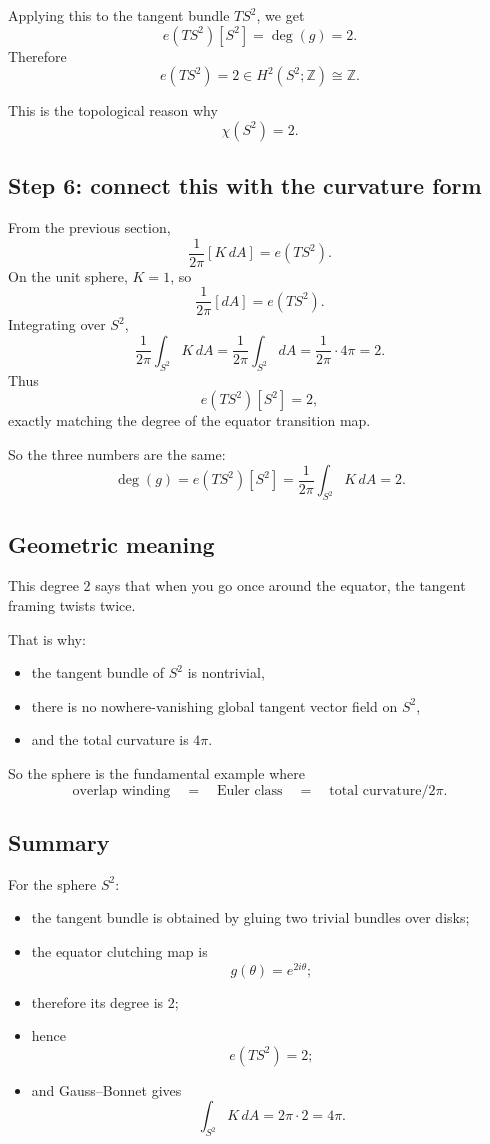 \documentclass[11pt]{article}
\begin{document}
	Applying this to the tangent bundle \(TS^2\), we get
	\[
	e(TS^2)[S^2]=\deg(g)=2.
	\]
	Therefore
	\[
	e(TS^2)=2\in H^2(S^2;\mathbb{Z})\cong \mathbb{Z}.
	\]
	
	This is the topological reason why
	\[
	\chi(S^2)=2.
	\]
	
	\subsection*{Step 6: connect this with the curvature form}
	
	From the previous section,
	\[
	\frac{1}{2\pi}[K\,dA]=e(TS^2).
	\]
	On the unit sphere, \(K=1\), so
	\[
	\frac{1}{2\pi}[dA]=e(TS^2).
	\]
	Integrating over \(S^2\),
	\[
	\frac{1}{2\pi}\int_{S^2}K\,dA
	=
	\frac{1}{2\pi}\int_{S^2}dA
	=
	\frac{1}{2\pi}\cdot 4\pi
	=
	2.
	\]
	Thus
	\[
	e(TS^2)[S^2]=2,
	\]
	exactly matching the degree of the equator transition map.
	
	So the three numbers are the same:
	\[
	\boxed{
		\deg(g)=e(TS^2)[S^2]=\frac{1}{2\pi}\int_{S^2}K\,dA=2.
	}
	\]
	
	\subsection*{Geometric meaning}
	
	This degree \(2\) says that when you go once around the equator, the tangent framing twists twice.
	
	That is why:
	\begin{itemize}
		\item the tangent bundle of \(S^2\) is nontrivial,
		\item there is no nowhere-vanishing global tangent vector field on \(S^2\),
		\item and the total curvature is \(4\pi\).
	\end{itemize}
	
	So the sphere is the fundamental example where
	\[
	\text{overlap winding}
	\quad=\quad
	\text{Euler class}
	\quad=\quad
	\text{total curvature}/2\pi.
	\]
	
	\subsection*{Summary}
	
	For the sphere \(S^2\):
	\begin{itemize}
		\item the tangent bundle is obtained by gluing two trivial bundles over disks;
		\item the equator clutching map is
		\[
		g(\theta)=e^{2i\theta};
		\]
		\item therefore its degree is \(2\);
		\item hence
		\[
		e(TS^2)=2;
		\]
		\item and Gauss--Bonnet gives
		\[
		\int_{S^2}K\,dA=2\pi\cdot 2 = 4\pi.
		\]
	\end{itemize}
\end{document}
